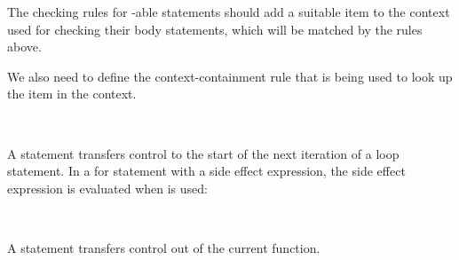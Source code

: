 \begin{Incomplete}
The checking rules for -able statements should add a suitable item to the context used for checking their body statements, which will be matched by the rules above.

We also need to define the context-containment rule that is being used to look up the  item in the context.
\end{Incomplete}


\begin{Syntax}
		 \SynOpt \code{;} \\
\end{Syntax}

\begin{Description}
A  statement transfers control to the start of the next iteration of a loop statement.
In a for statement with a side effect expression, the side effect expression is evaluated when  is used:
\end{Description}

\begin{Checking}
	 \\

\end{Checking}


\begin{Description}
	A  statement transfers control out of the current function.
\end{Description}
	
\begin{Syntax}
		 \SynOpt \code{;} \\
\end{Syntax}

\begin{Checking}
\end{Checking}

